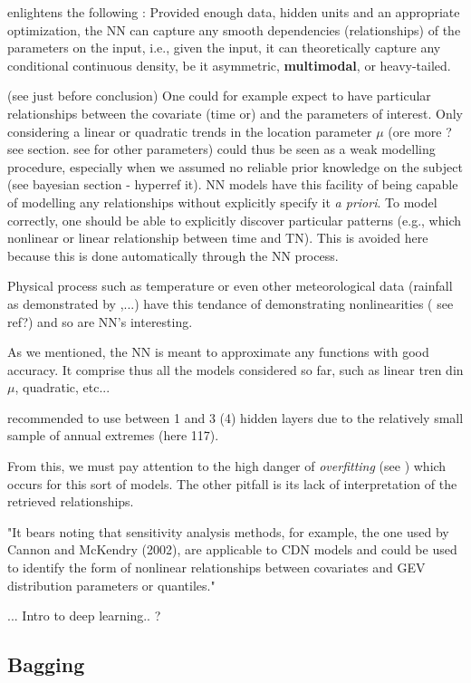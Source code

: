 \cite{carreau_hybrid_2009} enlightens the following : Provided enough data, hidden units and an appropriate optimization, the NN can capture any smooth dependencies (relationships) of the parameters on the input, i.e., given the input, it can theoretically capture any conditional continuous density, be it asymmetric, \textbf{multimodal}, or heavy-tailed.

(see \citet{cannon_flexible_2010} just before conclusion) 
One could for example expect to have particular relationships between the covariate (time or) and the parameters of interest. Only considering a linear or quadratic trends in the location parameter $\mu$ (ore more ? see section. see for other parameters) could thus be seen as a weak modelling procedure, especially when we assumed no reliable prior knowledge on the subject (see bayesian section - hyperref it).
NN models have this facility of being capable of modelling any relationships without explicitly specify it \emph{a priori}. To model correctly, one should be able to explicitly discover particular patterns (e.g., which nonlinear or linear relationship between time and TN). This is avoided here because this is done automatically through the NN process.

Physical process such as temperature or even other meteorological data (rainfall as demonstrated by \citet{cannon_flexible_2010},...) have this tendance of demonstrating nonlinearities ( see ref?) and so are NN's interesting.

As we mentioned, the NN is meant to approximate any functions with good accuracy. It comprise thus all the models considered so far, such as linear tren din $\mu$, quadratic, etc...

\citet{cannon_flexible_2010} recommended to use between 1 and 3 (4) hidden layers due to the relatively small sample of annual extremes (here 117).


From this, we must pay attention to the high danger of \emph{overfitting} (see ) which occurs for this sort of models. The other pitfall is its lack of interpretation of the retrieved relationships.

"It bears noting that sensitivity analysis methods,
for example, the one used by Cannon and McKendry
(2002), are applicable to CDN models and could be used
to identify the form of nonlinear relationships between
covariates and GEV distribution parameters or quantiles."

... Intro to deep learning.. ?

\subsection{Bagging} 

